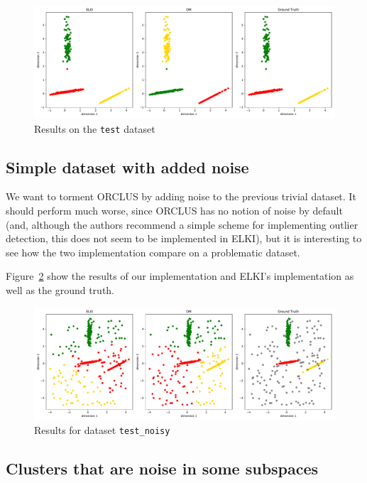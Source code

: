 \documentclass[english]{scrartcl}
\begin{document}
\begin{figure}[tb]
    \centering
    \includegraphics[width=\textwidth]{img/test_cmp}
    \caption{Results on the \texttt{test} dataset}
    \label{fig:test}
\end{figure}

\subsection{Simple dataset with added noise}

We want to torment ORCLUS by adding noise to the previous trivial dataset.
It should perform much worse, since ORCLUS has no notion of noise by default
(and, although the authors recommend a simple scheme for implementing outlier
detection, this does not seem to be implemented in ELKI), but it is interesting
to see how the two implementation compare on a problematic dataset.

Figure~\ref{fig:noisy-cmp} show the results
of our implementation and ELKI's implementation as well as the ground truth.

\begin{figure}[tb]
    \centering
    \includegraphics[width=\textwidth]{img/test_noisy_cmp}
    \caption{Results for dataset \texttt{test\_noisy}}
    \label{fig:noisy-cmp}
\end{figure}

\subsection{Clusters that are noise in some subspaces}
\end{document}
